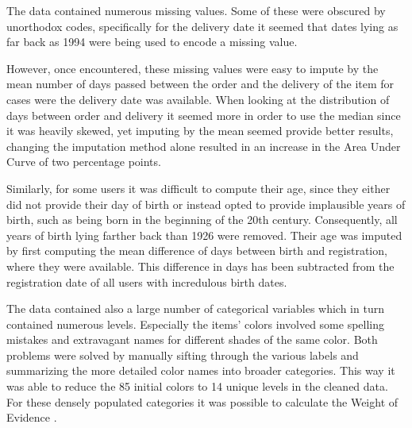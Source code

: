 
The data contained numerous missing values. Some of these were obscured by unorthodox codes, specifically for the delivery date it seemed that dates lying as far back as 1994 were being used to encode a missing value. 

However, once encountered, these missing values were easy to impute by the mean number of days passed between the order and the delivery of the item for cases were the delivery date was available. When looking at the distribution of days between order and delivery it seemed more in order to use the median since it was heavily skewed, yet imputing by the mean seemed provide better results, changing the imputation method alone resulted in an increase in the Area Under Curve of two percentage points.

Similarly, for some users it was difficult to compute their age, since they either did not provide their day of birth or instead opted to provide implausible years of birth, such as being born in the beginning of the 20th century. Consequently, all years of birth lying farther back than 1926 were removed. Their age was imputed by first computing the mean difference of days between birth and registration, where they were available. This difference in days has been subtracted from the registration date of all users with incredulous birth dates.

The data contained also a large number of categorical variables which in turn contained numerous levels. Especially the items' colors involved some spelling mistakes and extravagant names for different shades of the same color. Both problems were solved by manually sifting through the various labels and summarizing the more detailed color names into broader categories. This way it was able to reduce the 85 initial colors to 14 unique levels in the cleaned data. For these densely populated categories it was possible to calculate the Weight of Evidence \cite{woe}.

